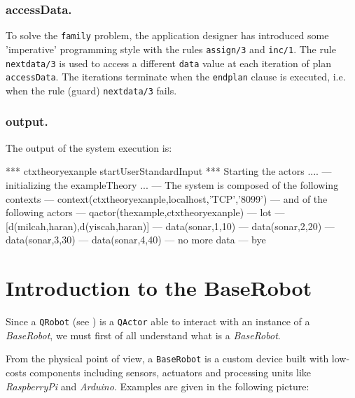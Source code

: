 \subsubsection{accessData.}
To solve the \texttt{family} problem, the application designer has introduced some 'imperative' programming style with the rules \texttt{assign/3} and \texttt{inc/1}. The rule \texttt{nextdata/3} is used to access a different \texttt{data} value at each iteration of plan \texttt{accessData}. The iterations terminate when the \texttt{endplan} clause is executed, i.e. when the rule (guard) \texttt{nextdata/3} fails.


\subsubsection{output.}
The output of the system execution is:
\begin{javacode}
*** ctxtheoryexanple startUserStandardInput ***
Starting the actors .... 
--- initializing the exampleTheory ...
--- 	The system is composed of the following contexts
--- context(ctxtheoryexanple,localhost,'TCP','8099')
--- 	 and  of the following actors
--- qactor(thexample,ctxtheoryexanple)
--- lot
--- [d(milcah,haran),d(yiscah,haran)]
--- data(sonar,1,10)
--- data(sonar,2,20)
--- data(sonar,3,30)
--- data(sonar,4,40)
--- no more data
--- bye
\end{javacode}


\newpage
\section{Introduction to the BaseRobot}
 
Since a \texttt{QRobot} (see  ) is a \texttt{QActor} able to interact with an instance of a \textit{BaseRobot}, we must first of all understand what is a \textit{BaseRobot}.


\medskip 
From the physical point of view, a \texttt{BaseRobot} is a custom device built with low-costs components including sensors, actuators and processing units like \textit{RaspberryPi} and \textit{Arduino}. Examples are given in the following picture:

